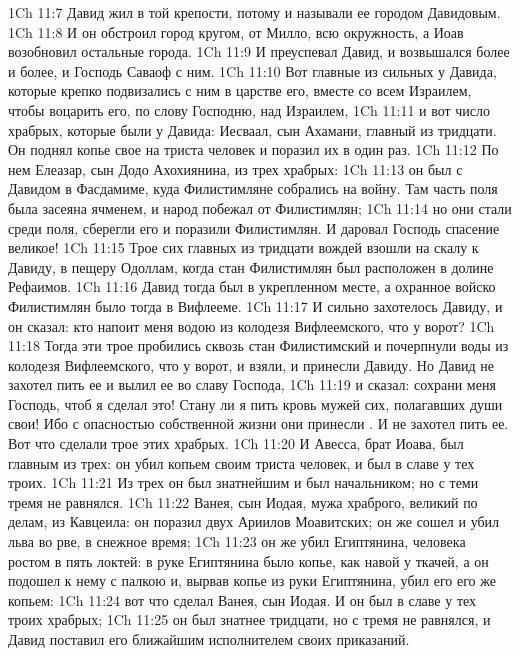 \vs 1Ch 11:7 Давид жил в той крепости, потому и называли ее городом Давидовым.
\vs 1Ch 11:8 И он обстроил город кругом,  от Милло, всю окружность, а Иоав возобновил остальные  города.
\vs 1Ch 11:9 И преуспевал Давид, и возвышался более и более, и Господь Саваоф  с ним.
\rsbpar\vs 1Ch 11:10 Вот главные из сильных у Давида, которые крепко подвизались с ним в царстве его, вместе со всем Израилем, чтобы воцарить его, по слову Господню, над Израилем,
\vs 1Ch 11:11 и вот число храбрых, которые были у Давида: Иесваал, сын Ахамани, главный из тридцати. Он поднял копье свое на триста человек и поразил их в один раз.
\vs 1Ch 11:12 По нем Елеазар, сын Додо Ахохиянина, из трех храбрых:
\vs 1Ch 11:13 он был с Давидом в Фасдамиме, куда Филистимляне собрались на войну. Там часть поля была засеяна ячменем, и народ побежал от Филистимлян;
\vs 1Ch 11:14 но они стали среди поля, сберегли его и поразили Филистимлян. И даровал Господь спасение великое!
\vs 1Ch 11:15 Трое сих главных из тридцати вождей взошли на скалу к Давиду, в пещеру Одоллам, когда стан Филистимлян был расположен в долине Рефаимов.
\vs 1Ch 11:16 Давид тогда был в укрепленном месте, а охранное войско Филистимлян было тогда в Вифлееме.
\vs 1Ch 11:17 И сильно захотелось  Давиду, и он сказал: кто напоит меня водою из колодезя Вифлеемского, что у ворот?
\vs 1Ch 11:18 Тогда эти трое пробились сквозь стан Филистимский и почерпнули воды из колодезя Вифлеемского, что у ворот, и взяли, и принесли Давиду. Но Давид не захотел пить ее и вылил ее во славу Господа,
\vs 1Ch 11:19 и сказал: сохрани меня Господь, чтоб я сделал это! Стану ли я пить кровь мужей сих, полагавших души свои! Ибо с опасностью собственной жизни они принесли . И не захотел пить ее. Вот что сделали трое этих храбрых.
\rsbpar\vs 1Ch 11:20 И Авесса, брат Иоава, был главным из трех: он убил копьем своим триста человек, и был в славе у тех троих.
\vs 1Ch 11:21 Из трех он был знатнейшим и был начальником; но с теми тремя не равнялся.
\rsbpar\vs 1Ch 11:22 Ванея, сын Иодая, мужа храброго, великий по делам, из Кавцеила: он поразил двух Ариилов Моавитских; он же сошел и убил льва во рве, в снежное время;
\vs 1Ch 11:23 он же убил Египтянина, человека ростом в пять локтей: в руке Египтянина было копье, как навой у ткачей, а он подошел к нему с палкою и, вырвав копье из руки Египтянина, убил его его же копьем:
\vs 1Ch 11:24 вот что сделал Ванея, сын Иодая. И он был в славе у тех троих храбрых;
\vs 1Ch 11:25 он был знатнее тридцати, но с тремя не равнялся, и Давид поставил его ближайшим исполнителем своих приказаний.
